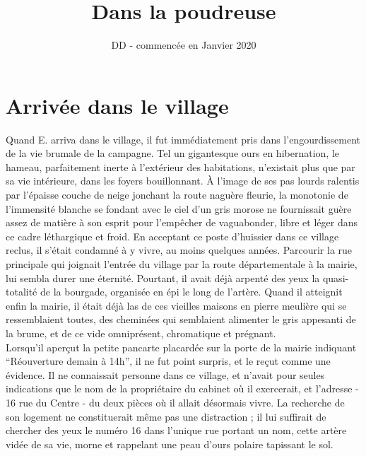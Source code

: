 \documentclass[french,amstex,12pt,a5paper]{book}
\begin{document}
\title{Dans la poudreuse}
\author{DD - commencée en Janvier 2020}
\maketitle

\tableofcontents

\chapter{Arrivée dans le village}

Quand E. arriva dans le village, il fut immédiatement pris dans l'engourdissement de la vie brumale de la campagne. Tel un gigantesque ours en hibernation, le hameau, parfaitement inerte à l'extérieur des habitations, n'existait plus que par sa vie intérieure, dans les foyers bouillonnant. À l'image de ses pas lourds ralentis par l'épaisse couche de neige jonchant la route naguère fleurie, la monotonie de l'immensité blanche se fondant avec le ciel d'un gris morose ne fournissait guère assez de matière à son esprit pour l'empêcher de vaguabonder, libre et léger dans ce cadre léthargique et froid. En acceptant ce poste d'huissier dans ce village reclus, il s'était condamné à y vivre, au moins quelques années. Parcourir la rue principale qui joignait l'entrée du village par la route départementale à la mairie, lui sembla durer une éternité. Pourtant, il avait déjà arpenté des yeux la quasi-totalité de la bourgade, organisée en épi le long de l'artère. Quand il atteignit enfin la mairie, il était déjà las de ces vieilles maisons en pierre meulière qui se ressemblaient toutes, des cheminées qui semblaient alimenter le gris appesanti de la brume, et de ce vide omniprésent, chromatique et prégnant.\\

Lorsqu'il aperçut la petite pancarte placardée sur la porte de la mairie indiquant ``Réouverture demain à 14h'', il ne fut point surpris, et le reçut comme une évidence. Il ne connaissait personne dans ce village, et n'avait pour seules indications que le nom de la propriétaire du cabinet où il exercerait, et l'adresse - 16 rue du Centre - du deux pièces où il allait désormais vivre. La recherche de son logement ne constituerait même pas une distraction ; il lui suffirait de chercher des yeux le numéro 16 dans l'unique rue portant un nom, cette artère vidée de sa vie, morne et rappelant une peau d'ours polaire tapissant le sol.\\
\end{document}
